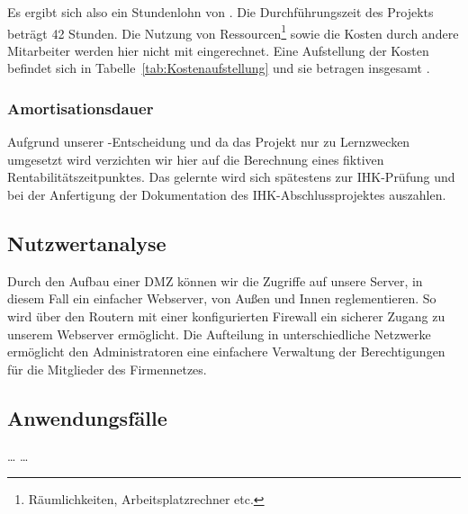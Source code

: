 Es ergibt sich also ein Stundenlohn von . 
Die Durchführungszeit des Projekts beträgt 42 Stunden. 
Die Nutzung von Ressourcen\footnote{Räumlichkeiten, Arbeitsplatzrechner etc.} sowie die Kosten durch andere Mitarbeiter werden hier nicht mit eingerechnet. 
Eine Aufstellung der Kosten befindet sich in Tabelle~\ref{tab:Kostenaufstellung} und sie betragen insgesamt .


\subsubsection{Amortisationsdauer}
\label{sec:Amortisationsdauer}

    Aufgrund unserer -Entscheidung und da das Projekt nur zu Lernzwecken umgesetzt wird verzichten wir hier auf die Berechnung eines fiktiven Rentabilitätszeitpunktes. Das gelernte wird sich spätestens zur IHK-Prüfung und bei der Anfertigung der Dokumentation des IHK-Abschlussprojektes auszahlen.

\subsection{Nutzwertanalyse}
\label{sec:Nutzwertanalyse}
Durch den Aufbau einer DMZ können wir die Zugriffe auf unsere Server, in diesem Fall ein einfacher Webserver, von Außen und Innen reglementieren. So wird über den Routern mit einer konfigurierten Firewall ein sicherer Zugang zu unserem Webserver ermöglicht. Die Aufteilung in unterschiedliche Netzwerke ermöglicht den Administratoren eine einfachere Verwaltung der Berechtigungen für die Mitglieder des Firmennetzes.



\subsection{Anwendungsfälle}
\label{sec:Anwendungsfaelle}
    \dots
    \dots

